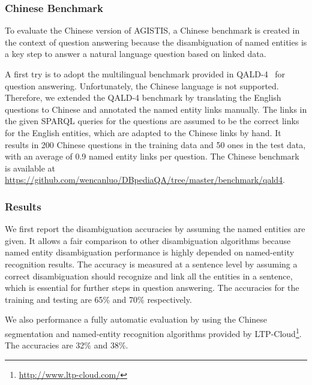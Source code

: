

\subsubsection{Chinese Benchmark}

To evaluate the Chinese version of AGISTIS, a Chinese benchmark is created in the context of question answering because the disambiguation of named entities is a key step to answer a natural language question based on linked data. 

A first try is to adopt the multilingual benchmark provided in QALD-4~\cite{qald4} for question answering. Unfortunately, the Chinese language is not supported. Therefore, we extended the QALD-4 benchmark by translating the English questions to Chinese and annotated the named entity links manually. The links in the given SPARQL queries for the questions are assumed to be the correct links for the English entities, which are adapted to the Chinese links by hand. It results in 200 Chinese questions in the training data and 50 ones in the test data, with an average of 0.9 named entity links per question. The Chinese benchmark is available at \url{https://github.com/wencanluo/DBpediaQA/tree/master/benchmark/qald4}.

\subsubsection{Results}
We first report the disambiguation accuracies by assuming the named entities are given. It allows a fair comparison to other disambiguation algorithms because named entity disambiguation performance is highly depended on named-entity recognition results. The accuracy is measured at a sentence level by assuming a correct disambiguation should recognize and link all the entities in a sentence, which is essential for further steps in question answering. The accuracies for the training and testing are 65\% and 70\% respectively. 

We also performance a fully automatic evaluation by using the Chinese segmentation and named-entity recognition algorithms provided by LTP-Cloud\footnote{\url{http://www.ltp-cloud.com/}}. 
The accuracies are 32\% and 38\%.

